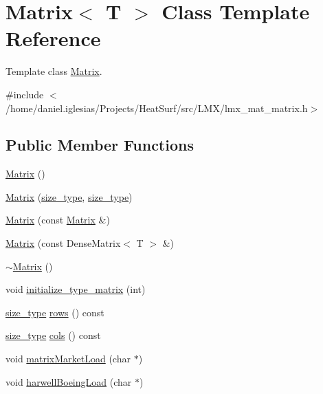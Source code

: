 \hypertarget{classMatrix}{\section{Matrix$<$ T $>$ Class Template Reference}
\label{classMatrix}
}


Template class \hyperlink{classMatrix}{Matrix}.  




{\ttfamily \#include $<$/home/daniel.\-iglesias/\-Projects/\-Heat\-Surf/src/\-L\-M\-X/lmx\-\_\-mat\-\_\-matrix.\-h$>$}

\subsection*{Public Member Functions}
\begin{DoxyCompactItemize}
\item 
\hyperlink{classMatrix_a9d567e3a121b1be0c3f9c461cab524fe}{Matrix} ()
\item 
\hyperlink{classMatrix_a6226a80c09e42ae07b64570bc7a76dda}{Matrix} (\hyperlink{lmx__mat__data_8h_a49b489a408a211a90e766329c0732d7b}{size\-\_\-type}, \hyperlink{lmx__mat__data_8h_a49b489a408a211a90e766329c0732d7b}{size\-\_\-type})
\item 
\hyperlink{classMatrix_a0e74261aca51167c58c5608c1422f950}{Matrix} (const \hyperlink{classMatrix}{Matrix} \&)
\item 
\hyperlink{classMatrix_a9991e9c15523215441a667db5f53e3fb}{Matrix} (const Dense\-Matrix$<$ T $>$ \&)
\item 
\hyperlink{classMatrix_a91aa704de674203e96aece9e1955ccd3}{$\sim$\-Matrix} ()
\item 
void \hyperlink{classMatrix_ab117b452cec366d3f2aa6f51f25dde56}{initialize\-\_\-type\-\_\-matrix} (int)
\item 
\hyperlink{lmx__mat__data_8h_a49b489a408a211a90e766329c0732d7b}{size\-\_\-type} \hyperlink{classMatrix_a94fa65c0c33679b20b23e8c6832d2f5f}{rows} () const 
\item 
\hyperlink{lmx__mat__data_8h_a49b489a408a211a90e766329c0732d7b}{size\-\_\-type} \hyperlink{classMatrix_a2c9cc747b6f786bb23cb44b3a01707c2}{cols} () const 
\item 
void \hyperlink{classMatrix_a93687e829e58842640899351998eb6d7}{matrix\-Market\-Load} (char $\ast$)
\item 
void \hyperlink{classMatrix_a1033ffed8225aa5b3b8d4ffd326d4372}{harwell\-Boeing\-Load} (char $\ast$)
\item 

\end{DoxyCompactItemize}
